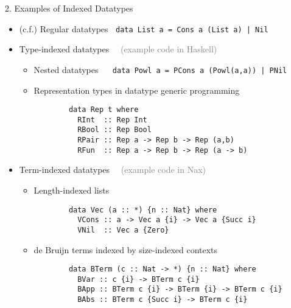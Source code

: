 \documentclass[final]{beamer}
\begin{document}
\begin{frame}[fragile]
\begin{columns}[t]
\begin{column}{.315\linewidth}
\begin{block}{2. Examples of Indexed Datatypes}
\begin{itemize}
\item[]$\!\!\!\!\!\!${\normalsize(c.f.)} Regular datatypes
	$~$ \lstinline!data List a = Cons a (List a) | Nil!
\item Type-indexed datatypes
	$\quad$\textcolor{gray}{\normalsize(example code in Haskell)}
	\begin{itemize}
		\item Nested datatypes $\quad$
			\lstinline!data Powl a = PCons a (Powl(a,a)) | PNil!
		\item Representation types in datatype generic programming
		\begin{lstlisting}
		data Rep t where
		  RInt  :: Rep Int
		  RBool :: Rep Bool
		  RPair :: Rep a -> Rep b -> Rep (a,b)
		  RFun  :: Rep a -> Rep b -> Rep (a -> b)
		\end{lstlisting}
	\end{itemize}
\item Term-indexed datatypes
	$\quad$\textcolor{gray}{\normalsize(example code in Nax)}
	\begin{itemize}
        	\item Length-indexed lists
		\begin{lstlisting}
		data Vec (a :: *) {n :: Nat} where
		  VCons :: a -> Vec a {i} -> Vec a {Succ i}
		  VNil  :: Vec a {Zero}
		\end{lstlisting}
		\item de Bruijn terms indexed by size-indexed contexts
		\begin{lstlisting}
		data BTerm (c :: Nat -> *) {n :: Nat} where
		  BVar :: c {i} -> BTerm c {i}
		  BApp :: BTerm c {i} -> BTerm {i} -> BTerm c {i}
		  BAbs :: BTerm c {Succ i} -> BTerm c {i}
		\end{lstlisting}
	\end{itemize}
\end{itemize} %
\end{block}

\end{column}
\begin{column}{.315\linewidth}


\end{column}
\end{columns}
\end{frame}
\end{document}
